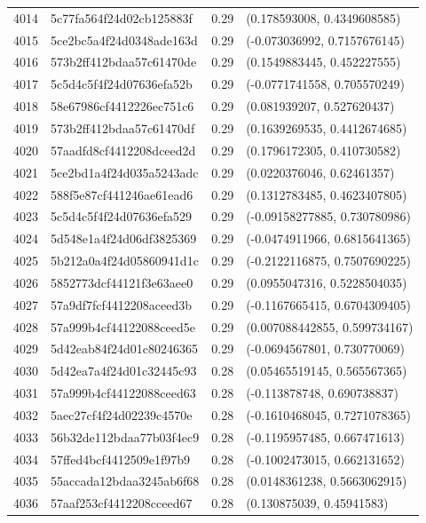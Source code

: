 \begin{table}[ht]
\begin{tabular}{rlrl}
  4014 & 5c77fa564f24d02cb125883f & 0.29 & (0.178593008, 0.4349608585) \\ 
  4015 & 5ce2bc5a4f24d0348ade163d & 0.29 & (-0.073036992, 0.7157676145) \\ 
  4016 & 573b2ff412bdaa57c61470de & 0.29 & (0.1549883445, 0.452227555) \\ 
  4017 & 5c5d4c5f4f24d07636efa52b & 0.29 & (-0.0771741558, 0.705570249) \\ 
  4018 & 58e67986cf4412226ec751c6 & 0.29 & (0.081939207, 0.527620437) \\ 
  4019 & 573b2ff412bdaa57c61470df & 0.29 & (0.1639269535, 0.4412674685) \\ 
  4020 & 57aadfd8cf4412208dceed2d & 0.29 & (0.1796172305, 0.410730582) \\ 
  4021 & 5ce2bd1a4f24d035a5243adc & 0.29 & (0.0220376046, 0.62461357) \\ 
  4022 & 588f5e87cf441246ae61ead6 & 0.29 & (0.1312783485, 0.4623407805) \\ 
  4023 & 5c5d4c5f4f24d07636efa529 & 0.29 & (-0.09158277885, 0.730780986) \\ 
  4024 & 5d548e1a4f24d06df3825369 & 0.29 & (-0.0474911966, 0.6815641365) \\ 
  4025 & 5b212a0a4f24d05860941d1c & 0.29 & (-0.2122116875, 0.7507690225) \\ 
  4026 & 5852773dcf44121f3e63aee0 & 0.29 & (0.0955047316, 0.5228504035) \\ 
  4027 & 57a9df7fcf4412208aceed3b & 0.29 & (-0.1167665415, 0.6704309405) \\ 
  4028 & 57a999b4cf44122088ceed5e & 0.29 & (0.007088442855, 0.599734167) \\ 
  4029 & 5d42eab84f24d01c80246365 & 0.29 & (-0.0694567801, 0.730770069) \\ 
  4030 & 5d42ea7a4f24d01c32445c93 & 0.28 & (0.05465519145, 0.565567365) \\ 
  4031 & 57a999b4cf44122088ceed63 & 0.28 & (-0.113878748, 0.690738837) \\ 
  4032 & 5aec27cf4f24d02239c4570e & 0.28 & (-0.1610468045, 0.7271078365) \\ 
  4033 & 56b32de112bdaa77b03f4ec9 & 0.28 & (-0.1195957485, 0.667471613) \\ 
  4034 & 57ffed4bcf4412509e1f97b9 & 0.28 & (-0.1002473015, 0.662131652) \\ 
  4035 & 55accada12bdaa3245ab6f68 & 0.28 & (0.0148361238, 0.5663062915) \\ 
  4036 & 57aaf253cf4412208cceed67 & 0.28 & (0.130875039, 0.45941583) \\ 

\end{tabular}
\end{table}
